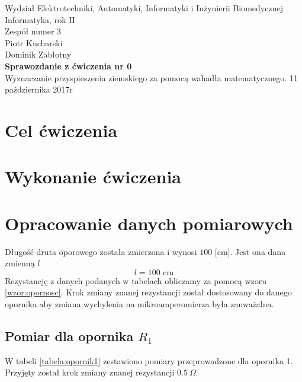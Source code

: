 \documentclass[a4paper,12pts]{article}
\begin{document}
	\thispagestyle{empty}
	\begin{flushleft}
		Wydział Elektrotechniki, Automatyki, Informatyki i Inżynierii Biomedycznej \\
		Informatyka, rok II \\
		Zespół numer 3 \\
		Piotr Kucharski \\
		Dominik Zabłotny \\
		\vspace*{\fill}
		{\large \textbf{Sprawozdanie z ćwiczenia nr 0} } \\
		Wyznaczanie przyspieszenia ziemskiego za pomocą wahadła matematycznego.		
		\vfill	
		11 października 2017r
	\end{flushleft}
	
	\newpage
	
	
	\section{Cel ćwiczenia}
	
	
	\section{Wykonanie ćwiczenia}
	
	
	\section{Opracowanie danych pomiarowych}
	Długość druta oporowego została zmierzona i wynosi $100$ [cm]. Jest ona dana zmienną $l$
	\begin{equation}
		l = 100 \textrm{ cm}
	\end{equation}
	Rezystancję z danych podanych w tabelach obliczamy za pomocą wzoru \ref{wzor:opornosc}. Krok zmiany znanej rezystancji został dostosowany do danego opornika aby zmiana wychylenia na mikroamperomierza była zauważalna.
	
	\subsection{Pomiar dla opornika $R_1$}
	W tabeli \ref{tabela:opornik1} zestawiono pomiary przeprowadzone dla opornika 1. Przyjęty został krok zmiany znanej rezystancji $0.5 ~\Omega$.
	
\end{document}
